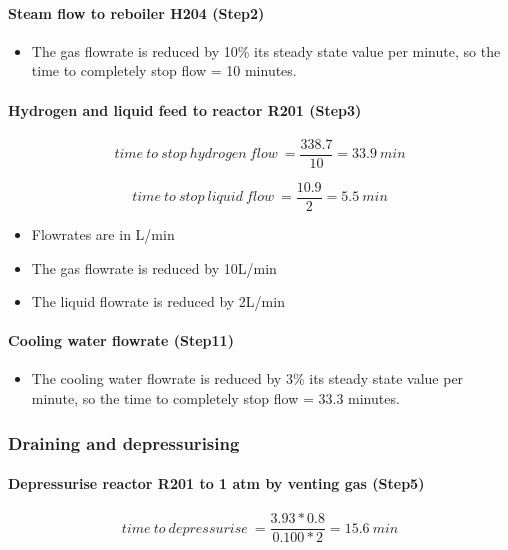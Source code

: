 \paragraph{Steam flow to reboiler H204 (Step2)}   
    \begin{itemize}
        \item The gas flowrate is reduced by 10\% its steady state value per minute, so the time to completely stop flow = 10 minutes.
    \end{itemize}
    
\paragraph{Hydrogen and liquid feed to reactor R201 (Step3)}
    \begin{equation}
        time\:to\:stop\:hydrogen\:flow\:=\frac{338.7}{10}=33.9\:min
    \end{equation}
    
    \begin{equation}
        time\:to\:stop\:liquid\:flow\:=\frac{10.9}{2}=5.5\:min
    \end{equation}
    
    \begin{itemize}
        \item Flowrates are in L/min
        \item The gas flowrate is reduced by 10L/min
        \item The liquid flowrate is reduced by 2L/min
    \end{itemize}
    
\paragraph{Cooling water flowrate (Step11)}
    \begin{itemize}
        \item The cooling water flowrate is reduced by 3\% its steady state value per minute, so the time to completely stop flow = 33.3 minutes.
    \end{itemize}
    
\subsubsection{Draining and depressurising}   
\paragraph{Depressurise reactor R201 to 1 atm by venting gas (Step5)}
    \begin{equation}
        time\:to\:depressurise\:=\frac{3.93 * 0.8}{0.100 * 2}=15.6\:min
    \end{equation}
    
